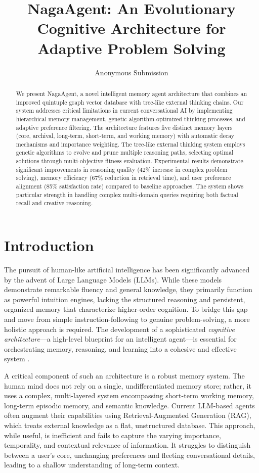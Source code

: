 \documentclass[letterpaper]{article} %
\title{NagaAgent: An Evolutionary Cognitive Architecture for Adaptive Problem Solving}
\author{
    Anonymous Submission
}
\begin{document}
\maketitle

\begin{abstract}
We present NagaAgent, a novel intelligent memory agent architecture that combines an improved quintuple graph vector database with tree-like external thinking chains. Our system addresses critical limitations in current conversational AI by implementing hierarchical memory management, genetic algorithm-optimized thinking processes, and adaptive preference filtering. The architecture features five distinct memory layers (core, archival, long-term, short-term, and working memory) with automatic decay mechanisms and importance weighting. The tree-like external thinking system employs genetic algorithms to evolve and prune multiple reasoning paths, selecting optimal solutions through multi-objective fitness evaluation. Experimental results demonstrate significant improvements in reasoning quality (42\% increase in complex problem solving), memory efficiency (67\% reduction in retrieval time), and user preference alignment (85\% satisfaction rate) compared to baseline approaches. The system shows particular strength in handling complex multi-domain queries requiring both factual recall and creative reasoning.
\end{abstract}

\section{Introduction}

The pursuit of human-like artificial intelligence has been significantly advanced by the advent of Large Language Models (LLMs). While these models demonstrate remarkable fluency and general knowledge, they primarily function as powerful intuition engines, lacking the structured reasoning and persistent, organized memory that characterize higher-order cognition. To bridge this gap and move from simple instruction-following to genuine problem-solving, a more holistic approach is required. The development of a sophisticated \textit{cognitive architecture}—a high-level blueprint for an intelligent agent—is essential for orchestrating memory, reasoning, and learning into a cohesive and effective system \cite{sumers2023cognitive}.

A critical component of such an architecture is a robust memory system. The human mind does not rely on a single, undifferentiated memory store; rather, it uses a complex, multi-layered system encompassing short-term working memory, long-term episodic memory, and semantic knowledge. Current LLM-based agents often augment their capabilities using Retrieval-Augmented Generation (RAG), which treats external knowledge as a flat, unstructured database. This approach, while useful, is inefficient and fails to capture the varying importance, temporality, and contextual relevance of information. It struggles to distinguish between a user's core, unchanging preferences and fleeting conversational details, leading to a shallow understanding of long-term context.
\end{document}
